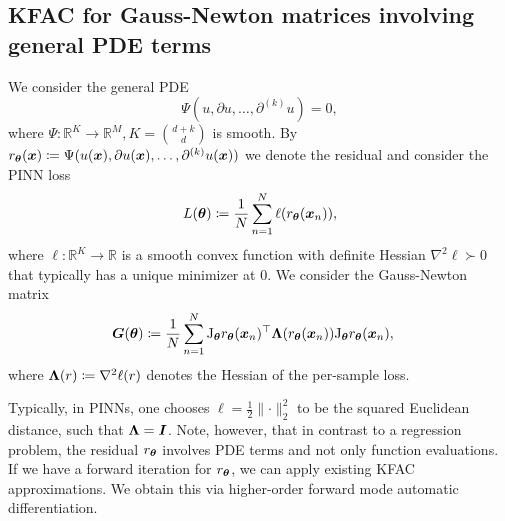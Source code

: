 \subsection{KFAC for Gauss-Newton matrices involving general PDE terms} \label{sec:KFAC-general}
We consider the general %
PDE
\begin{equation}
    \Psi(u, \partial u, \dots, \partial^{(k)} u) = 0,
\end{equation}
where $\Psi\colon \mathbb R^{K}\to\mathbb R^M,K=\binom{d+k}{d}$ is smooth.
By $r_\vtheta(\vx)\coloneqq \Psi(u(\vx), \partial u(\vx), \dots, \partial^{(k)} u(\vx))%
$ %
we denote the residual and consider the PINN loss
\begin{equation}
    L({\bm{\theta}})\coloneqq \frac1N\sum_{n=1}^N \ell(r_{{\bm{\theta}}}({\bm{x}}_n)),
\end{equation}
where $\ell\colon\mathbb R^K\to\mathbb R$ is a smooth convex function with definite Hessian $\nabla^2\ell\succ0$ that typically has a unique minimizer at $0$.
We consider the Gauss-Newton matrix
\begin{align}
    {\bm{G}}({\bm{\theta}}) & \coloneqq \frac1N\sum_{n=1}^N \mathrm{J}_{\bm{\theta}} r_{\bm{\theta}}({\bm{x}}_n)^\top {\bm{\Lambda}}(r_{\bm{\theta}}({\bm{x}}_n)) \mathrm{J}_{\bm{\theta}} r_{\bm{\theta}}({\bm{x}}_n),
\end{align}
where ${\bm{\Lambda}}(r)\coloneqq \nabla^2 \ell(r)$ denotes the Hessian of the per-sample loss. %

Typically, in PINNs, one chooses $\ell = \frac12\lVert \cdot \rVert_2^2$ to be the squared Euclidean distance, such that ${\bm{\Lambda}} = {\bm{I}}$.
Note, however, that in contrast to a regression problem, the residual $r_{\bm{\theta}}$ involves PDE terms and not only function evaluations.
If we have a forward iteration for $r_{\bm{\theta}}$, we can apply existing KFAC approximations.
We obtain this via higher-order forward mode automatic differentiation.

